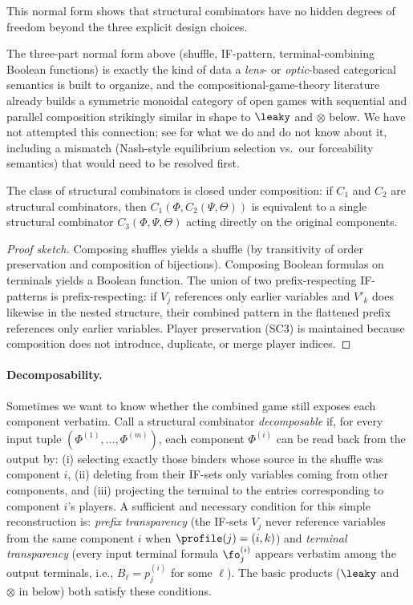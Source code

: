 This normal form shows that structural combinators have no hidden degrees of
freedom beyond the three explicit design choices.

\begin{remark}
The three-part normal form above (shuffle, IF-pattern, terminal-combining
Boolean functions) is exactly the kind of data a \emph{lens}- or
\emph{optic}-based categorical semantics is built to organize, and the
compositional-game-theory literature already builds a symmetric monoidal
category of open games with sequential and parallel composition strikingly
similar in shape to $\leaky$ and $\otimes$ below. We have not attempted this
connection; see  for what we do and do not know about
it, including a mismatch (Nash-style equilibrium selection vs.\ our
forceability semantics) that would need to be resolved first.
\end{remark}

\begin{proposition}
\label{prop:combinator-closure}
The class of structural combinators is closed under composition: if $C_1$ and 
$C_2$ are structural combinators, then 
$C_1(\Phi, C_2(\Psi, \Theta))$ is equivalent to a single structural combinator 
$C_3(\Phi, \Psi, \Theta)$ acting directly on the original components.
\end{proposition}
\begin{proof}[Proof sketch]
Composing shuffles yields a shuffle (by transitivity of order preservation and 
composition of bijections). Composing Boolean formulas on terminals yields a 
Boolean function. The union of two prefix-respecting IF-patterns is 
prefix-respecting: if $V_j$ references only earlier variables and $V'_k$ does 
likewise in the nested structure, their combined pattern in the flattened prefix 
references only earlier variables. Player preservation (SC3) is maintained 
because composition does not introduce, duplicate, or merge player indices.
\end{proof}

\paragraph{Decomposability.}
Sometimes we want to know whether the combined game still exposes each component
verbatim. Call a structural combinator \emph{decomposable} if, for every input
tuple $(\Phi^{(1)},\dots,\Phi^{(m)})$, each component $\Phi^{(i)}$ can be read
back from the output by:
(i) selecting exactly those binders whose source in the shuffle was component $i$,
(ii) deleting from their IF-sets only variables coming from other components, and
(iii) projecting the terminal to the entries corresponding to component $i$'s players.
A sufficient and necessary condition for this simple reconstruction is:
\emph{prefix transparency} (the IF-sets $V_j$ never reference variables from the 
same component $i$ when $\profile(j) = (i,k)$) and \emph{terminal transparency} 
(every input terminal formula $\fo^{(i)}_j$ appears verbatim among the output 
terminals, i.e., $B_\ell = p^{(i)}_j$ for some $\ell$).
The basic products ($\leaky$ and $\otimes$ in  below) 
both satisfy these conditions.

